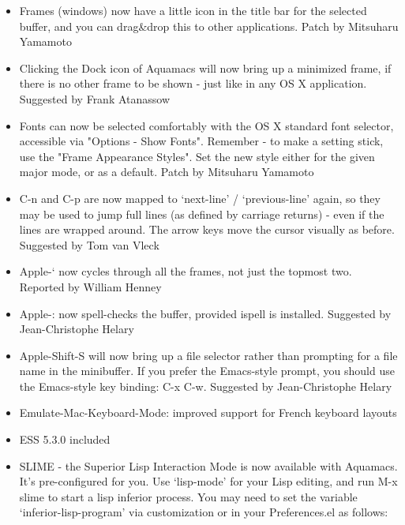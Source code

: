 \begin{itemize}


\item  Frames (windows) now have a little icon in the title bar for the
        selected buffer, and you can drag\&drop this to other applications.
        Patch by  Mitsuharu Yamamoto

\item  Clicking the Dock icon of Aquamacs will now bring up a minimized
        frame, if there is no other frame to be shown - just like in any
        OS X application.
        Suggested by Frank Atanassow

\item  Fonts can now be selected comfortably with the OS X standard
        font selector, accessible via "Options - Show Fonts".
        Remember  - to make a setting stick, use the "Frame Appearance
        Styles". Set the new style either for the given major mode, or as
        a default.
        Patch by  Mitsuharu Yamamoto

\item  C-n and C-p are now mapped to `next-line' / `previous-line'
        again, so they may be used to jump full lines (as defined by
        carriage returns) - even if the lines are wrapped around. The
        arrow keys move the cursor visually as before.
        Suggested by Tom van Vleck

\item  Apple-` now cycles through all the frames, not just the topmost two.
        Reported by William Henney

\item  Apple-: now spell-checks the buffer, provided ispell is installed.
        Suggested by Jean-Christophe Helary

\item  Apple-Shift-S will now bring up a file selector rather than
        prompting for a file name in the minibuffer. If you prefer the
        Emacs-style prompt, you should use the Emacs-style key binding:
        C-x C-w.
        Suggested by Jean-Christophe Helary

\item  Emulate-Mac-Keyboard-Mode: improved support for French keyboard
        layouts

\item  ESS 5.3.0 included

\item  SLIME - the Superior Lisp Interaction Mode is now available with
        Aquamacs. It's pre-configured for you. Use `lisp-mode' for your
        Lisp editing, and run M-x slime to start a lisp inferior
        process. You may need to set the variable `inferior-lisp-program'
        via customization or in your Preferences.el as follows:


\end{itemize}
